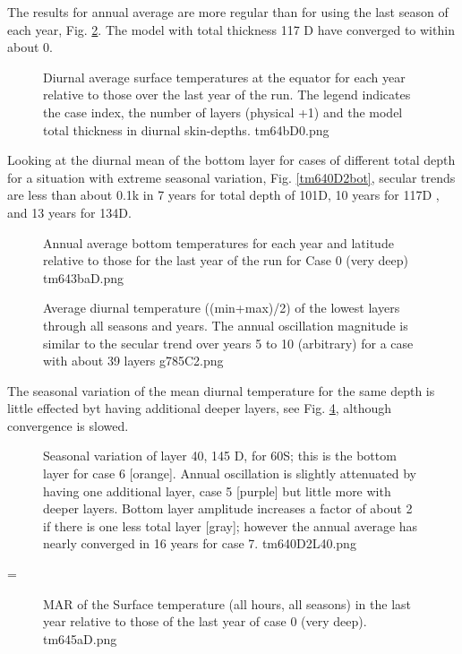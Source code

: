 \documentclass{article}
\begin{document}
 The results for annual average are more regular than for using the last season
 of each year, Fig. \ref{tm643baD}. The model with total thickness 117 D have
 converged to within about 0.

\begin{figure}[!ht] 
\caption[Run D surface]{ Diurnal average surface temperatures at the equator for
  each year relative to those over the last year of the run. The legend
  indicates the case index, the number of layers (physical +1) and the model
  total thickness in diurnal skin-depths.
\label{tm64bD0}  tm64bD0.png }
\end{figure} 

Looking at the diurnal mean of the bottom layer for cases of different total
depth for a situation with extreme seasonal variation, Fig. \ref{tm640D2bot},
secular trends are less than about 0.1k in 7 years for total depth of 101D, 10
years for 117D , and 13 years for 134D.


\begin{figure}[!ht] 
\caption[Run D bottom]{Annual average bottom temperatures for each year and
  latitude relative to those for the last year of the run for Case 0 (very deep)
\label{tm643baD}  tm643baD.png }
\end{figure} 

\begin{figure}[!ht] 
\caption[bottom secular trend]{Average diurnal temperature ((min+max)/2) of the
  lowest layers through all seasons and years. The annual oscillation magnitude
  is similar to the secular trend over years 5 to 10 (arbitrary) for a case with
  about 39 layers
\label{g785C2} g785C2.png }
\end{figure} 

The seasonal variation of the mean diurnal temperature for the same depth is little effected byt having additional deeper layers, see Fig. \ref{tm640D2L40}, although convergence is slowed.

\begin{figure}[!ht] 
\caption[Seasonal variation at a fixed depth]{Seasonal variation of layer 40, 145 D, for 60S; this is the bottom layer for case 6 [orange]. Annual oscillation is slightly attenuated by having one additional layer, case 5 [purple] but little more with deeper layers. Bottom layer amplitude increases a factor of about 2 if there is one less total layer [gray]; however the annual average has nearly converged in 16 years for case 7. 
\label{tm640D2L40}  tm640D2L40.png }
\end{figure} 
=
\begin{figure}[!ht] 
\caption[MAR versus case]{MAR of the Surface temperature (all hours, all seasons) in the last year relative to those of the last year of case 0 (very deep).
\label{tm645aD} tm645aD.png  }
\end{figure} 
\end{document}
